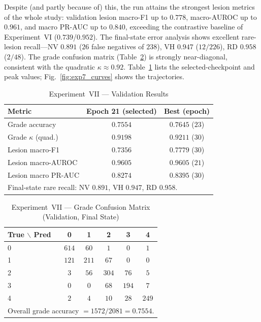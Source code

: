\documentclass[journal,twoside,web]{ieeecolor}
\begin{document}
Despite (and partly because of) this, the run attains the strongest lesion metrics
of the whole study: validation lesion macro-F1 up to $0.778$, macro-AUROC up to
$0.961$, and macro PR-AUC up to $0.840$, exceeding the contrastive baseline of
Experiment~VI ($0.739$/$0.952$). The final-state error analysis shows excellent
rare-lesion recall---NV $0.891$ ($26$ false negatives of $238$), VH $0.947$
($12/226$), RD $0.958$ ($2/48$). The grade confusion matrix
(Table~\ref{tab:exp7_cm}) is strongly near-diagonal, consistent with the quadratic
$\kappa\approx0.92$. Table~\ref{tab:exp7_res} lists the selected-checkpoint and peak
values; Fig.~\ref{fig:exp7_curves} shows the trajectories.

\begin{table}[!t]
\caption{Experiment~VII --- Validation Results}
\label{tab:exp7_res}
\centering
\setlength{\tabcolsep}{5pt}
\begin{tabular}{|l|c|c|}
\hline
\textbf{Metric} & \textbf{Epoch 21 (selected)} & \textbf{Best (epoch)} \\
\hline
Grade accuracy & $0.7554$ & $0.7645$ ($23$) \\
Grade $\kappa$ (quad.) & $0.9198$ & $0.9211$ ($30$) \\
Lesion macro-F1 & $0.7356$ & $0.7779$ ($30$) \\
Lesion macro-AUROC & $0.9605$ & $0.9605$ ($21$) \\
Lesion macro PR-AUC & $0.8274$ & $0.8395$ ($30$) \\
\hline
\multicolumn{3}{|l|}{Final-state rare recall: NV $0.891$, VH $0.947$, RD $0.958$.} \\
\hline
\end{tabular}
\end{table}

\begin{table}[!t]
\caption{Experiment~VII --- Grade Confusion Matrix (Validation, Final State)}
\label{tab:exp7_cm}
\centering
\setlength{\tabcolsep}{5pt}
\begin{tabular}{|l|c|c|c|c|c|}
\hline
\textbf{True $\backslash$ Pred} & \textbf{0} & \textbf{1} & \textbf{2} & \textbf{3} & \textbf{4} \\
\hline
0 & $614$ & $60$ & $1$ & $0$ & $1$ \\
1 & $121$ & $211$ & $67$ & $0$ & $0$ \\
2 & $3$ & $56$ & $304$ & $76$ & $5$ \\
3 & $0$ & $0$ & $68$ & $194$ & $7$ \\
4 & $2$ & $4$ & $10$ & $28$ & $249$ \\
\hline
\multicolumn{6}{|l|}{Overall grade accuracy $=1572/2081=0.7554$.} \\
\hline
\end{tabular}
\end{table}
\end{document}
